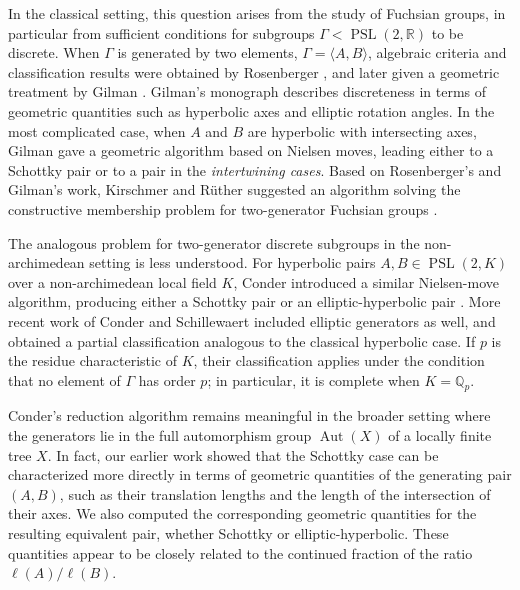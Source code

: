 \documentclass[12pt,leqno]{amsart}
\newcommand{\2}{L^2_{\rm per}(0, T)}
\newcommand{\aut}{{\operatorname{Aut}}}
\newcommand{\psl}{{\operatorname{PSL}}}
\numberwithin{equation}{section}
\numberwithin{figure}{section}
\begin{document}
In the classical setting, this question arises from the study of Fuchsian groups, in particular from sufficient conditions for subgroups $\Gamma<\psl(2,\mathbb{R})$ to be discrete. When $\Gamma$ is generated by two elements, $\Gamma = \langle A,B\rangle$, algebraic criteria and classification results were obtained by Rosenberger \cite{rosenberger1986all}, and later given a geometric treatment by Gilman \cite{gilman1995two}. Gilman’s monograph describes discreteness in terms of geometric quantities such as hyperbolic axes and elliptic rotation angles. In the most complicated case, when $A$ and $B$ are hyperbolic with intersecting axes, Gilman gave a geometric algorithm based on Nielsen moves, leading either to a Schottky pair or to a pair in the \emph{intertwining cases}. Based on Rosenberger's and Gilman's work, Kirschmer and R\"uther suggested an algorithm solving the constructive membership problem for two-generator Fuchsian groups \cite{kirschmer2017constructive}.

The analogous problem for two-generator discrete subgroups in the non-archimedean setting is less understood. For hyperbolic pairs $A,B\in\psl(2,K)$ over a non-archimedean local field $K$, Conder introduced a similar Nielsen-move algorithm, producing either a Schottky pair or an elliptic-hyperbolic pair \cite{conder2020discrete}. More recent work of Conder and Schillewaert \cite{conder2022discrete} included elliptic generators as well, and obtained a partial classification analogous to the classical hyperbolic case. If $p$ is the residue characteristic of $K$, their classification applies under the condition that no element of $\Gamma$ has order $p$; in particular, it is complete when $K = \mathbb{Q}_p$.

Conder’s reduction algorithm remains meaningful in the broader setting where the generators lie in the full automorphism group $\aut(X)$ of a locally finite tree $X$. In fact, our earlier work \cite{Du_Hersonsky_Tree_Aut} showed that the Schottky case can be characterized more directly in terms of geometric quantities of the generating pair $(A,B)$, such as their translation lengths and the length of the intersection of their axes. We also computed the corresponding geometric quantities for the resulting equivalent pair, whether Schottky or elliptic-hyperbolic. These quantities appear to be closely related to the continued fraction of the ratio $\ell(A)/\ell(B)$.
\end{document}
